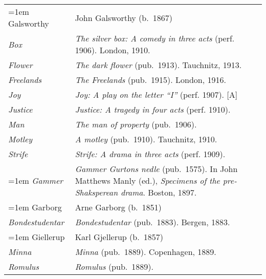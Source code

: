 \begin{xltabular}{\textwidth}{ lQ }
\hangindent=1em  Galsworthy & John Galsworthy (b.~1867)\\
\hspace{1em}\textit{Box} & \textit{The silver box: A comedy in three acts} (perf. 1906). London, 1910. \\
\hspace{1em}\textit{Flower} & \textit{The dark flower} (pub.~1913). Tauchnitz, 1913.  \\
\hspace{1em}\textit{Freelands} & \textit{The Freelands} (pub.~1915). London, 1916. \\
\hspace{1em}\textit{Joy} & \textit{Joy: A play on the letter ``I''} (perf. 1907). [A] \\ %
\hspace{1em}\textit{Justice} & \textit{Justice: A tragedy in four acts} (perf. 1910). \\ %
\hspace{1em}\textit{Man} & \textit{The man of property} (pub.~1906). \\
\hspace{1em}\textit{Motley} & \textit{A motley} (pub.~1910). Tauchnitz, 1910. \\
\hspace{1em}\textit{Strife} & \textit{Strife: A drama in three acts} (perf. 1909). \\ %

\hangindent=1em  \textit{Gammer} & \textit{Gammer Gurtons nedle} (pub.~1575). In John Matthews Manly (ed.), \textit{Specimens of the pre-Shaksperean drama}. Boston, 1897. \\ %

\hangindent=1em  Garborg & Arne Garborg (b.~1851) \\
\hspace{1em}\textit{Bondestudentar} & \textit{Bondestudentar} (pub.~1883). Bergen, 1883.\\

\hangindent=1em  Giellerup & Karl Gjellerup (b.~1857) \\
\hspace{1em}\textit{Minna} & \textit{Minna} (pub.~1889). Copenhagen, 1889. \\ %
\hspace{1em}\textit{Romulus} & \textit{Romulus} (pub.~1889). \\ %


\end{xltabular}
